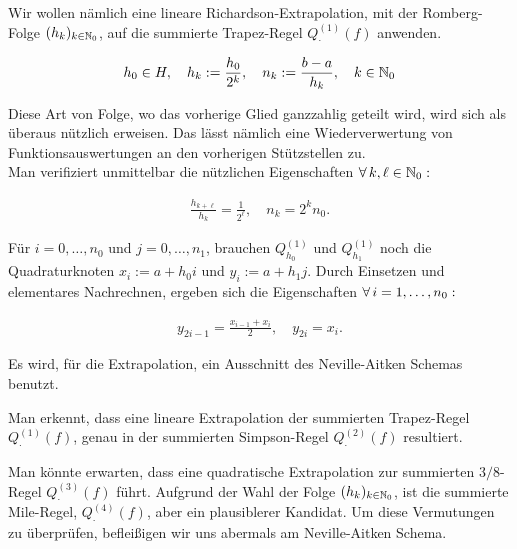 Wir wollen nämlich eine lineare Richardson-Extrapolation, mit der Romberg-Folge $(h_k)_{k \in \mathbb{N}_0}$, auf die summierte Trapez-Regel $Q_\cdot^{(1)}(f)$ anwenden.

\begin{align*}
    h_0 \in H, \quad
    h_k := \frac{h_0}{2^k}, \quad
    n_k := \frac{b-a}{h_k}, \quad
    k \in \mathbb{N}_0
\end{align*}

Diese Art von Folge, wo das vorherige Glied ganzzahlig geteilt wird, wird sich als überaus nützlich erweisen. Das lässt nämlich eine Wiederverwertung von Funktionsauswertungen an den vorherigen Stützstellen zu. \\

Man verifiziert unmittelbar die nützlichen Eigenschaften $\forall \, k, \ell \in \mathbb{N}_0:$

\begin{align*}
    \frac{h_{k + \ell}}{h_k} = \frac{1}{2^\ell}, \quad
    n_k = 2^k n_0.
\end{align*}

Für $i = 0, \ldots, n_0$ und $j = 0, \ldots, n_1$, brauchen $Q_{h_0}^{(1)}$ und $Q_{h_1}^{(1)}$ noch die Quadraturknoten $x_i := a + h_0 i$ und $y_i := a + h_1 j$. Durch Einsetzen und elementares Nachrechnen, ergeben sich die Eigenschaften $\forall \, i = 1, \ldots, n_0:$

\begin{align*}
    y_{2i - 1} = \frac{x_{i-1} + x_i}{2}, \quad
    y_{2i} = x_i.
\end{align*}

Es wird, für die Extrapolation, ein Ausschnitt des Neville-Aitken Schemas benutzt.



Man erkennt, dass eine lineare Extrapolation der summierten Trapez-Regel $Q_\cdot^{(1)}(f)$, genau in der summierten Simpson-Regel $Q_\cdot^{(2)}(f)$ resultiert.



Man könnte erwarten, dass eine quadratische Extrapolation zur summierten $3/8$-Regel $Q_\cdot^{(3)}(f)$ führt. Aufgrund der Wahl der Folge $(h_k)_{k \in \mathbb{N}_0}$, ist die summierte Mile-Regel, $Q_\cdot^{(4)}(f)$, aber ein plausiblerer Kandidat. Um diese Vermutungen zu überprüfen, befleißigen wir uns abermals am Neville-Aitken Schema.



